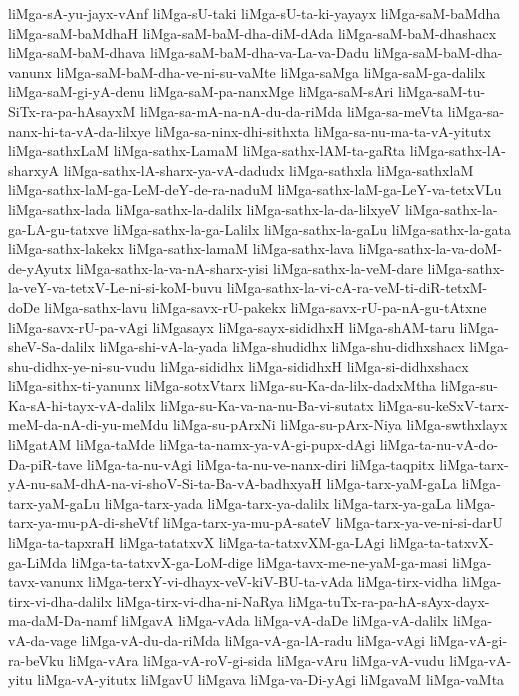 {liMga-sA-yu-jayx-vAnf
liMga-sU-taki
liMga-sU-ta-ki-yayayx
liMga-saM-baMdha
liMga-saM-baMdhaH
liMga-saM-baM-dha-diM-dAda
liMga-saM-baM-dhashacx
liMga-saM-baM-dhava
liMga-saM-baM-dha-va-La-va-Dadu
liMga-saM-baM-dha-vanunx
liMga-saM-baM-dha-ve-ni-su-vaMte
liMga-saMga
liMga-saM-ga-dalilx
liMga-saM-gi-yA-denu
liMga-saM-pa-nanxMge
liMga-saM-sAri
liMga-saM-tu-SiTx-ra-pa-hAsayxM
liMga-sa-mA-na-nA-du-da-riMda
liMga-sa-meVta
liMga-sa-nanx-hi-ta-vA-da-lilxye
liMga-sa-ninx-dhi-sithxta
liMga-sa-nu-ma-ta-vA-yitutx
liMga-sathxLaM
liMga-sathx-LamaM
liMga-sathx-lAM-ta-gaRta
liMga-sathx-lA-sharxyA
liMga-sathx-lA-sharx-ya-vA-dadudx
liMga-sathxla
liMga-sathxlaM
liMga-sathx-laM-ga-LeM-deY-de-ra-naduM
liMga-sathx-laM-ga-LeY-va-tetxVLu
liMga-sathx-lada
liMga-sathx-la-dalilx
liMga-sathx-la-da-lilxyeV
liMga-sathx-la-ga-LA-gu-tatxve
liMga-sathx-la-ga-Lalilx
liMga-sathx-la-gaLu
liMga-sathx-la-gata
liMga-sathx-lakekx
liMga-sathx-lamaM
liMga-sathx-lava
liMga-sathx-la-va-doM-de-yAyutx
liMga-sathx-la-va-nA-sharx-yisi
liMga-sathx-la-veM-dare
liMga-sathx-la-veY-va-tetxV-Le-ni-si-koM-buvu
liMga-sathx-la-vi-cA-ra-veM-ti-diR-tetxM-doDe
liMga-sathx-lavu
liMga-savx-rU-pakekx
liMga-savx-rU-pa-nA-gu-tAtxne
liMga-savx-rU-pa-vAgi
liMgasayx
liMga-sayx-sididhxH
liMga-shAM-taru
liMga-sheV-Sa-dalilx
liMga-shi-vA-la-yada
liMga-shudidhx
liMga-shu-didhxshacx
liMga-shu-didhx-ye-ni-su-vudu
liMga-sididhx
liMga-sididhxH
liMga-si-didhxshacx
liMga-sithx-ti-yanunx
liMga-sotxVtarx
liMga-su-Ka-da-lilx-dadxMtha
liMga-su-Ka-sA-hi-tayx-vA-dalilx
liMga-su-Ka-va-na-nu-Ba-vi-sutatx
liMga-su-keSxV-tarx-meM-da-nA-di-yu-meMdu
liMga-su-pArxNi
liMga-su-pArx-Niya
liMga-swthxlayx
liMgatAM
liMga-taMde
liMga-ta-namx-ya-vA-gi-pupx-dAgi
liMga-ta-nu-vA-do-Da-piR-tave
liMga-ta-nu-vAgi
liMga-ta-nu-ve-nanx-diri
liMga-taqpitx
liMga-tarx-yA-nu-saM-dhA-na-vi-shoV-Si-ta-Ba-vA-badhxyaH
liMga-tarx-yaM-gaLa
liMga-tarx-yaM-gaLu
liMga-tarx-yada
liMga-tarx-ya-dalilx
liMga-tarx-ya-gaLa
liMga-tarx-ya-mu-pA-di-sheVtf
liMga-tarx-ya-mu-pA-sateV
liMga-tarx-ya-ve-ni-si-darU
liMga-ta-tapxraH
liMga-tatatxvX
liMga-ta-tatxvXM-ga-LAgi
liMga-ta-tatxvX-ga-LiMda
liMga-ta-tatxvX-ga-LoM-dige
liMga-tavx-me-ne-yaM-ga-masi
liMga-tavx-vanunx
liMga-terxY-vi-dhayx-veV-kiV-BU-ta-vAda
liMga-tirx-vidha
liMga-tirx-vi-dha-dalilx
liMga-tirx-vi-dha-ni-NaRya
liMga-tuTx-ra-pa-hA-sAyx-dayx-ma-daM-Da-namf
liMgavA
liMga-vAda
liMga-vA-daDe
liMga-vA-dalilx
liMga-vA-da-vage
liMga-vA-du-da-riMda
liMga-vA-ga-lA-radu
liMga-vAgi
liMga-vA-gi-ra-beVku
liMga-vAra
liMga-vA-roV-gi-sida
liMga-vAru
liMga-vA-vudu
liMga-vA-yitu
liMga-vA-yitutx
liMgavU
liMgava
liMga-va-Di-yAgi
liMgavaM
liMga-vaMta
}
